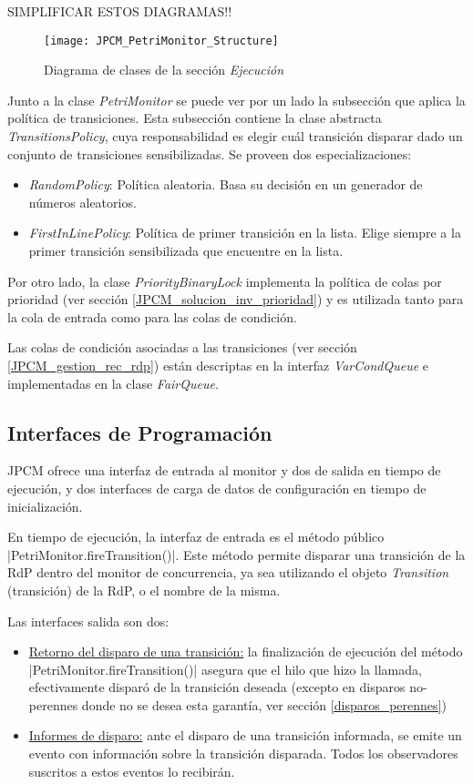 {\color{red} SIMPLIFICAR ESTOS DIAGRAMAS!!}
\begin{figure}[H]
  \hspace*{-2.5cm}
  \texttt{[image: JPCM\_PetriMonitor\_Structure]}
  \caption{Diagrama de clases de la sección \textit{Ejecución}}
  \label{fig:JPCM_PetriMonitor_Structure}
\end{figure}

Junto a la clase \textit{PetriMonitor} se puede ver por un lado la subsección
que aplica la política de transiciones. Esta subsección contiene la clase
abstracta \textit{TransitionsPolicy}, cuya responsabilidad es elegir cuál
transición disparar dado un conjunto de transiciones sensibilizadas.
Se proveen dos especializaciones: 
\begin{itemize}
  \item \textit{RandomPolicy}: Política aleatoria. Basa su decisión en un
  generador de números aleatorios.
  \item \textit{FirstInLinePolicy}: Política de primer transición en la lista.
  Elige siempre a la primer transición sensibilizada que encuentre en la lista.
\end{itemize}

Por otro lado, la clase \textit{PriorityBinaryLock} implementa la política de
colas por prioridad (ver sección \ref{JPCM_solucion_inv_prioridad}) y es
utilizada tanto para la cola de entrada como para las colas de condición.

Las colas de condición asociadas a las transiciones (ver sección
\ref{JPCM_gestion_rec_rdp}) están descriptas en la interfaz
\textit{VarCondQueue} e implementadas en la clase \textit{FairQueue}.


\subsection{Interfaces de Programación}

JPCM ofrece una interfaz de entrada al monitor y dos de salida en tiempo de
ejecución, y dos interfaces de carga de datos de configuración en tiempo de
inicialización.

En tiempo de ejecución, la interfaz de entrada es el método público 
|PetriMonitor.fireTransition()|. Este método permite disparar una
transición de la RdP dentro del monitor de concurrencia, ya sea utilizando el
objeto \textit{Transition} (transición) de la RdP, o el nombre de la misma.

Las interfaces salida son dos:
\begin{itemize}
  \item \underline{Retorno del disparo de una transición:} la finalización de
  ejecución del método |PetriMonitor.fireTransition()| asegura que el
  hilo que hizo la llamada, efectivamente disparó de la transición deseada
  (excepto en disparos no-perennes donde no se desea esta garantía, ver sección
  \ref{disparos_perennes})
  \item \underline{Informes de disparo:} ante el disparo de una
  transición informada, se emite un evento con información sobre la transición
  disparada. Todos los observadores suscritos a estos eventos lo recibirán.
\end{itemize}

